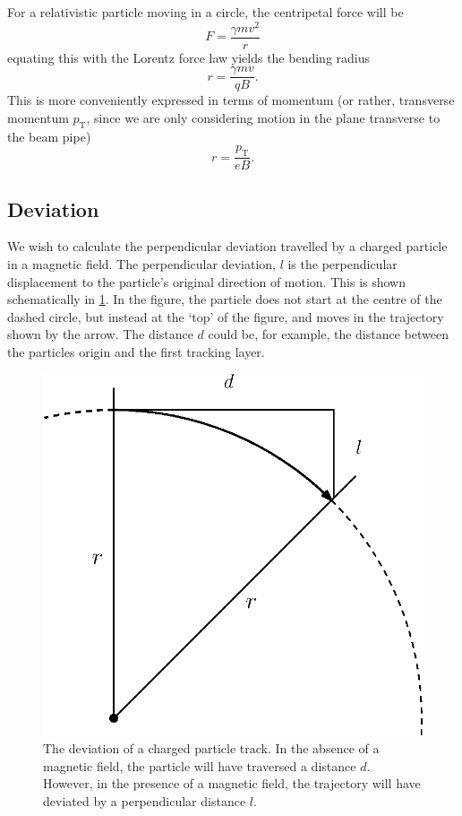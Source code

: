 \documentclass[a4paper, 12pt]{article}
\newcommand{\pt}{\ensuremath{p_{\mathrm{T}}}\xspace}
\begin{document}
For a relativistic particle moving in a circle, the centripetal force will be 
\begin{equation}
F = \frac{\gamma m v^2}{r}
\end{equation}
equating this with the Lorentz force law yields the bending radius
\begin{equation}
r = \frac{\gamma m v}{qB}.
\end{equation}
This is more conveniently expressed in terms of momentum (or rather, transverse momentum \pt, since we are only considering motion in the plane transverse to the beam pipe)
\begin{equation}
  \boxed{
  r = \frac{\pt}{eB}.
}
  \label{eq:bendingRadius}
\end{equation}

\subsection{Deviation}
We wish to calculate the perpendicular deviation travelled by a charged particle in a magnetic field. 
The perpendicular deviation, $l$ is the perpendicular displacement to the particle's original direction of motion. 
This is shown schematically in \cref{fig:deviation}. 
In the figure, the particle does not start at the centre of the dashed circle, but instead at the `top' of the figure, and moves in the trajectory shown by the arrow. 
The distance $d$ could be, for example, the distance between the particles origin and the first tracking layer. 

\begin{figure}
  \centering
  \includegraphics[width=0.5\linewidth]{images/fig1.eps}
  \caption{The deviation of a charged particle track. 
  In the absence of a magnetic field, the particle will have traversed a distance $d$.
  However, in the presence of a magnetic field, the trajectory will have deviated by a perpendicular distance $l$. 
  }
  \label{fig:deviation}
\end{figure}
\end{document}
